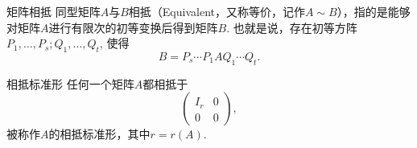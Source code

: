\begin{frame}

\begin{block}{矩阵相抵}
同型矩阵$A$与$B$相抵（Equivalent，又称等价，记作$A\sim B$），指的是能够对矩阵$A$进行有限次的初等变换后得到矩阵$B$. 也就是说，存在初等方阵$P_1,\ldots,P_s;Q_1,\ldots,Q_t$, 使得
$$B = P_s \cdots P_1 A Q_1 \cdots Q_t.$$
\end{block}

\pause

\begin{block}{相抵标准形}
任何一个矩阵$A$都相抵于
$$\begin{pmatrix}
I_r & 0 \\ 0 & 0
\end{pmatrix},$$
被称作$A$的相抵标准形，其中$r = r(A)$.
\end{block}

\end{frame}


















